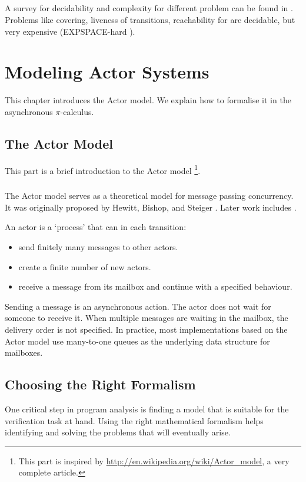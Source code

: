 \documentclass[a4paper]{report}
\numberwithin{algorithm}{chapter}
\begin{document}
\paragraph{}
A survey for \pns{} decidability and complexity for different problem can be found in \cite{DBLP:journals/eik/EsparzaN94}.
Problems like covering, liveness of transitions, reachability for \pns{} are decidable, but very expensive (EXPSPACE-hard \cite{DBLP:conf/stoc/CardozaLM76}).


\chapter{Modeling Actor Systems}
\label{chapModel}
This chapter introduces the Actor model.
We explain how to formalise it in the asynchronous $\pi$-calculus.

\section{The Actor Model}
\label{actorModel}
This part is a brief introduction to the Actor model
\footnote{This part is inspired by \url{http://en.wikipedia.org/wiki/Actor_model}, a very complete article.}.

\paragraph{}
The Actor model serves as a theoretical model for message passing concurrency.
It was originally proposed by Hewitt, Bishop, and Steiger \cite{DBLP:conf/ijcai/HewittBS73}.
Later work includes \cite{WilliamClinger81,GulAgha86}.

An actor is a `process' that can in each transition:
\begin{itemize}
\item send finitely many messages to other actors.
\item create a finite number of new actors.
\item receive a message from its mailbox and continue with a specified behaviour.
\end{itemize}

Sending a message is an asynchronous action.
The actor does not wait for someone to receive it.
When multiple messages are waiting in the mailbox, the delivery order is not specified.
In practice, most implementations based on the Actor model use many-to-one queues as the underlying data structure for mailboxes.

\section{Choosing the Right Formalism}
One critical step in program analysis is finding a model that is suitable for the verification task at hand.
Using the right mathematical formalism helps identifying and solving the problems that will eventually arise.
\end{document}
